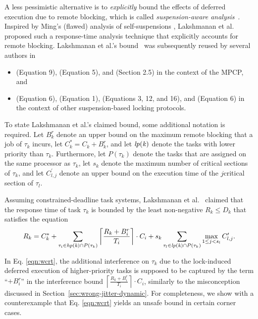 A less pessimistic alternative is to \emph{explicitly} bound the effects of deferred execution due to remote blocking, which is called \emph{suspension-aware analysis}~\cite{BA:10b}. Inspired by Ming's (flawed) analysis of self-suspensions  \cite{MingLiRTCSA1994}, Lakshmanan et al.~\cite{lakshmanan-2009} proposed such a response-time analysis technique that explicitly accounts for remote blocking.  Lakshmanan et al.'s  bound~\cite{lakshmanan-2009} was subsequently reused by several authors in
\begin{itemize}
\item \cite{zeng-2011} (Equation 9), \cite{han-2014} (Equation 5), and \cite{yang-2014} (Section 2.5) in the context of the MPCP, and
\item \cite{yang-2013} (Equation 6), \cite{bbb-2013} (Equation 1), \cite{carminati-2014} (Equations 3, 12, and 16), and \cite{kim-2014} (Equation 6)  in the context of other suspension-based locking protocols.
\end{itemize}

To state  Lakshmanan et al.'s claimed bound, some additional notation is required. Let $B_k^r$ denote an upper bound on the maximum remote blocking that a job of $\tau_k$ incurs, let $C_k^{\ast} = C_k + B_k^r$, and let $\mathit{lp(k)}$ denote the tasks with lower priority than $\tau_k$. Furthermore, let $P(\tau_k)$ denote the tasks that are assigned on the same processor as $\tau_k$, let $s_k$ denote the maximum number of critical sections of $\tau_k$, and let $C_{l,j}^{\prime}$ denote an upper bound on the execution time of the $j$\xth critical section of $\tau_l$.

Assuming constrained-deadline task systems, Lakshmanan et al.~\cite{lakshmanan-2009} claimed that the response time of task $\tau_k$ is bounded by the least non-negative $R_k \leq D_k$ that satisfies the equation
\begin{equation}
\label{eqn:wcrt}
R_k = C_k^{\ast} + \sum_{\tau_i \in \mathit{hp(k)} \cap P(\tau_k)} \left \lceil \frac{R_k + B_i^r}{T_i} \right \rceil \cdot C_i + s_k \sum_{\tau_l \in \mathit{lp(k)} \cap P(\tau_k)} \max_{1 \leq j < s_l} C_{l,j}^{\prime}.
\end{equation}



In Eq. \eqref{eqn:wcrt}, the additional interference on $\tau_k$ due to the lock-induced deferred execution of higher-priority tasks is supposed to be captured by the term ``$+ B^r_i$'' in the interference bound  $\left \lceil \frac{R_k + B_i^r}{T_i} \right \rceil \cdot C_i$,  similarly to the misconception discussed in Section~\ref{sec:wrong-jitter-dynamic}. For completeness, we show with a counterexample that Eq. \eqref{eqn:wcrt} yields an unsafe bound in certain corner cases.

